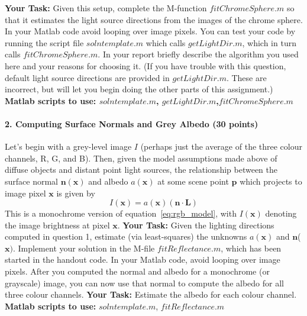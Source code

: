 \documentclass{paper}
\begin{document}
\textbf{Your Task: }Given this setup, complete the M-function $fitChromeSphere.m$ so that it estimates the light source directions from the images of the chrome sphere. In your Matlab code avoid looping over image pixels. You can test your code by running the script file $solntemplate.m$ which calls $getLightDir.m$, which in turn calls $fitChromeSphere.m$. In your report briefly describe the algorithm you used here and your reasons for choosing it. (If you have trouble with this question, default light source directions are provided in $getLightDir.m$. These are incorrect, but will let you begin doing the other parts of this assignment.)\newline
\textbf{Matlab scripts to use: $solntemplate.m$, $getLightDir.m$,\newline $fitChromeSphere.m$} 

\paragraph{2. Computing Surface Normals and Grey Albedo (30 points)}
Let's begin with a grey-level image $I$ (perhaps just the average of the three colour channels, R, G, and B). Then, given the model assumptions made above of diffuse objects and distant point light sources, the relationship between the surface normal $\mathbf{n}(\mathbf{x})$ and albedo $a(\mathbf{x})$ at some scene point $\mathbf{p}$ which projects to image pixel $\mathbf{x}$ is given by
\begin{equation}
I(\mathbf{x})=a(\mathbf{x})(\mathbf{n}\cdot\mathbf{L})
\end{equation}
This is a monochrome version of equation~\eqref{eq:rgb_model}, with $I(\textbf{x})$ denoting the image brightness at pixel $\mathbf{x}$.\newline
\textbf{Your Task: }Given the lighting directions computed in question 1, estimate (via least-squares) the unknowns $a(\mathbf{x})$ and $\mathbf{n}$($\mathbf{x})$. 
Implement your solution in the M-file $fitReflectance.m$, which has been started in the handout code. In your Matlab code, avoid looping over image pixels. After you computed the normal and albedo for a monochrome (or grayscale) image, you can now use that normal to compute the albedo for all three colour channels.\newline
\textbf{Your Task:} Estimate the albedo for each colour channel.\newline
\textbf{Matlab scripts to use:} $solntemplate.m$, $fitReflectance.m$
\end{document}
